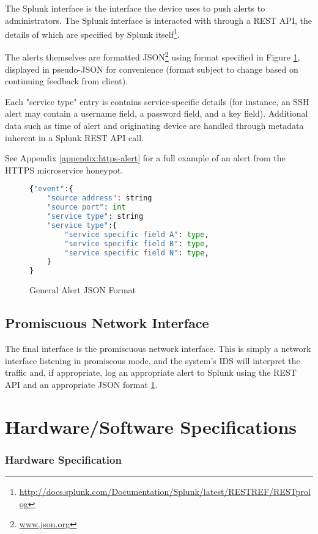 The Splunk interface is the interface the device uses to push alerts to
administrators. The Splunk interface is interacted with through a
REST API, the details of which are specified by Splunk itself\footnote{\url{http://docs.splunk.com/Documentation/Splunk/latest/RESTREF/RESTprolog}}.

The alerts themselves are formatted JSON\footnote{\url{www.json.org}} using
format specified in Figure \ref{figure:alert-format}, displayed in pseudo-JSON
for convenience (format subject to change based on continuing feedback from
client).

Each "service type" entry is contains service-specific details (for instance,
an SSH alert may contain a username field, a password field, and a key field).
Additional data such as time of alert and originating device are handled
through metadata inherent in a Splunk REST API call.

See Appendix \ref{appendix:https-alert} for a full example of an alert from
the HTTPS microservice honeypot.

\begin{figure}
\begin{lstlisting}[language=Python,frame=single,showstringspaces=false]
{"event":{
    "source address": string
    "source port": int
    "service type": string
    "service type":{
        "service specific field A": type,
        "service specific field B": type,
        "service specific field N": type,
    }
}
\end{lstlisting}
\caption{General Alert JSON Format}
\label{figure:alert-format}
\end{figure}

\subsection{Promiscuous Network Interface}

The final interface is the promiscuous network interface. This is simply
a network interface listening in promiscous mode, and the system's IDS
will interpret the traffic and, if appropriate, log an appropriate alert
to Splunk using the REST API and an appropriate JSON format
\ref{figure:alert-format}.

\section{Hardware/Software Specifications}

\subsubsection{Hardware Specification}

